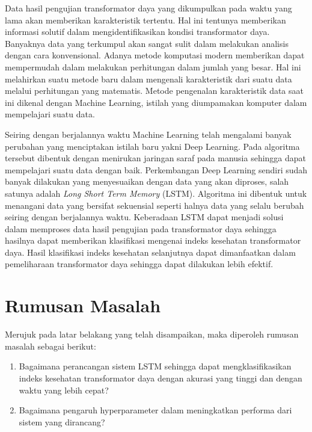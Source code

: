 Data hasil pengujian transformator daya yang dikumpulkan pada waktu yang lama akan memberikan karakteristik tertentu. Hal ini tentunya memberikan informasi solutif dalam mengidentifikasikan kondisi transformator daya. Banyaknya data yang terkumpul akan sangat sulit dalam melakukan analisis dengan cara konvensional. Adanya metode komputasi modern memberikan dapat mempermudah dalam melakukan perhitungan dalam jumlah yang besar. Hal ini melahirkan suatu metode baru dalam mengenali karakteristik dari suatu data melalui perhitungan yang matematis. Metode pengenalan karakteristik data saat ini dikenal dengan Machine Learning, istilah yang diumpamakan komputer dalam mempelajari suatu data.\par
Seiring dengan berjalannya waktu Machine Learning telah mengalami banyak perubahan yang menciptakan istilah baru yakni Deep Learning. Pada algoritma tersebut dibentuk dengan menirukan jaringan saraf pada manusia sehingga dapat mempelajari suatu data dengan baik. Perkembangan Deep Learning sendiri sudah banyak dilakukan yang menyesuaikan dengan data yang akan diproses, salah satunya adalah \textit{Long Short Term Memory} (LSTM). Algoritma ini dibentuk untuk menangani data yang bersifat sekuensial seperti halnya data yang selalu berubah seiring dengan berjalannya waktu. Keberadaan LSTM dapat menjadi solusi dalam memproses data hasil pengujian pada transformator daya sehingga hasilnya dapat memberikan klasifikasi mengenai indeks kesehatan transformator daya. Hasil klasifikasi indeks kesehatan selanjutnya dapat dimanfaatkan dalam pemeliharaan transformator daya sehingga dapat dilakukan lebih efektif.


\section{Rumusan Masalah}
Merujuk pada latar belakang yang telah disampaikan, maka diperoleh rumusan masalah sebagai berikut:
\begin{enumerate}
	\item Bagaimana perancangan sistem LSTM sehingga dapat mengklasifikasikan indeks kesehatan transformator daya dengan akurasi yang tinggi dan dengan waktu yang lebih cepat?
	\item Bagaimana pengaruh hyperparameter dalam meningkatkan performa dari sistem yang dirancang?
\end{enumerate}


